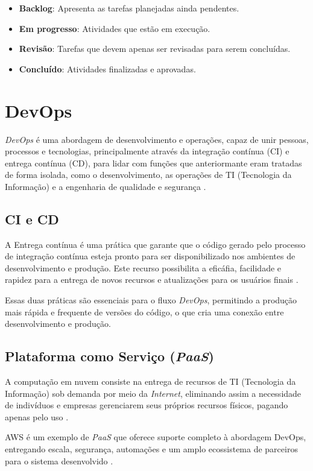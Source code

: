 \begin{itemize}
    \item \textbf{Backlog}: Apresenta as tarefas planejadas ainda pendentes.
    \item \textbf{Em progresso}: Atividades que estão em execução.
    \item \textbf{Revisão}: Tarefas que devem apenas ser revisadas para serem concluídas.
    \item \textbf{Concluído}: Atividades finalizadas e aprovadas.
\end{itemize}


\section{DevOps}
\textit{DevOps} é uma abordagem de desenvolvimento e operações, capaz de unir pessoas, processos e tecnologias, principalmente através da integração contínua (CI) e entrega contínua (CD), para lidar com funções que anteriormante eram tratadas de forma isolada, como o desenvolvimento, as operações de TI (Tecnologia da Informação) e a engenharia de qualidade e segurança \cite{microsoftdevops}.

\subsection{CI e CD}
A Entrega contínua é uma prática que garante que o código gerado pelo processo de integração contínua esteja pronto para ser disponibilizado nos ambientes de desenvolvimento e produção. Este recurso possibilita a eficáfia, facilidade e rapidez para a entrega de novos recursos e atualizações para os usuários finais \cite{gomes2023}.

Essas duas práticas são essenciais para o fluxo \textit{DevOps}, permitindo a produção mais rápida e frequente de versões do código, o que cria uma conexão entre desenvolvimento e produção.

\subsection{Plataforma como Serviço (\textit{PaaS})}
A computação em nuvem consiste na entrega de recursos de TI (Tecnologia da Informação) sob demanda por meio da \textit{Internet}, eliminando assim a necessidade de indivíduos e empresas gerenciarem seus próprios recursos físicos, pagando apenas pelo uso \cite{awscloudcomputing}.

AWS é um exemplo de \textit{PaaS} que oferece suporte completo à abordagem DevOps, entregando escala, segurança, automações e um amplo ecossistema de parceiros para o sistema desenvolvido \cite{awsdevops}.

